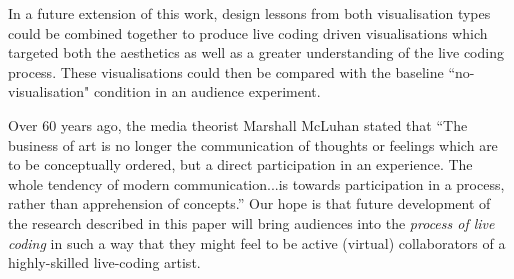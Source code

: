 \documentclass{sig-alternate}
\begin{document}
In a future extension of this work, design lessons from both visualisation types could be combined together to produce live coding driven visualisations which targeted both the aesthetics as well as a greater understanding of the live coding process. These visualisations could then be compared with the baseline ``no-visualisation" condition in an audience experiment. 


Over 60 years ago, the media theorist Marshall McLuhan stated that ``The business of art is no longer the communication of thoughts or feelings which are to be conceptually ordered, but a direct participation in an experience. The whole tendency of modern communication...is towards participation in a process, rather than apprehension of concepts.'' \cite{McLuhan} Our hope is that future development of the research described in this paper will bring audiences into the {\em process of live coding} in such a way that they might feel to be active (virtual) collaborators of a highly-skilled live-coding artist.




\end{document}
